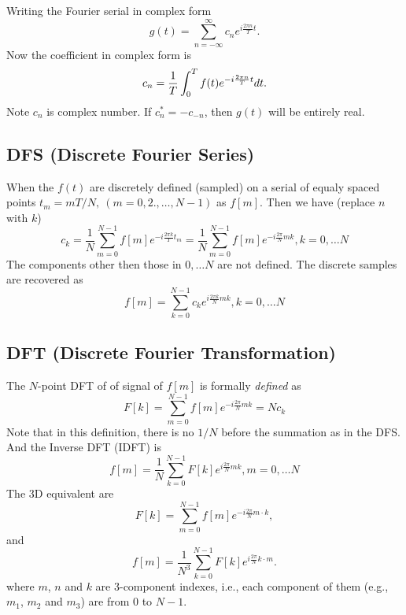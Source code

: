 \documentclass[11pt]{amsart}
\begin{document}
Writing the Fourier serial in complex form
\begin{equation}
g(t) = \sum_{n = -\infty}^{\infty} c_n e^{i\frac{2\pi n}{T}t}.
\end{equation}
Now the coefficient in complex form is
\begin{equation}
c_n = {1\over T}\int_0^T f(t) e^{-i\frac{2\pi n}{T}t}dt.
\end{equation}
Note $c_n$ is complex number. If $c^*_n = -c_{-n}$, then $g(t)$ will be entirely real. 

\subsection{DFS (Discrete Fourier  Series)}
When the $f(t)$ are discretely defined (sampled) on a serial of equaly spaced points $t_m = mT/N,~(m = 0, 2., \ldots, N-1)$ as $f[m]$. Then we have (replace $n$ with $k$)
\begin{equation}
c_k = \frac{1}{N} \sum_{m=0}^{N-1}f[m] e^{-i\frac{2\pi k}{T}t_m} = 
 \frac{1}{N} \sum_{m=0}^{N-1}f[m] e^{-i\frac{2\pi}{N}mk}, k = 0, \ldots N
\end{equation}
The components	other then those in $0, \ldots N$ are not defined. The discrete samples are recovered as
\begin{equation}
f[m] =  \sum_{k=0}^{N-1}c_k e^{i\frac{2\pi k}{N}mk}, k = 0, \ldots N
\end{equation}


\subsection{DFT (Discrete Fourier Transformation)}
The $N$-point DFT of of signal of $f[m]$ is formally \emph{defined} as
\begin{equation}
F[k] =  \sum_{m=0}^{N-1}f[m]e^{-i\frac{2\pi}{N}mk} = N c_k
\end{equation}
{\color{red}Note that in this definition, there is no $1/N$ before the summation as in the DFS.}
And the Inverse DFT (IDFT) is
\begin{equation}\label{idft}
f[m] = \frac{1}{N} \sum_{k=0}^{N-1}F[k] e^{i\frac{2\pi}{N}mk}, m = 0, \ldots N
\end{equation}
The 3D equivalent are
\begin{equation}
F[k] =  \sum_{m=0}^{N-1}f[m]e^{-i\frac{2\pi}{N}m\cdot k},
\end{equation}
and
\begin{equation}
f[m] = \frac{1}{N^3} \sum_{k=0}^{N-1}F[k] e^{i\frac{2\pi}{N}k\cdot m}.
\end{equation}
where $m$, $n$ and $k$ are 3-component indexes, i.e., each component of them (e.g., $m_1$, $m_2$ and $m_3$) are from $0$ to $N-1$.
\end{document}
